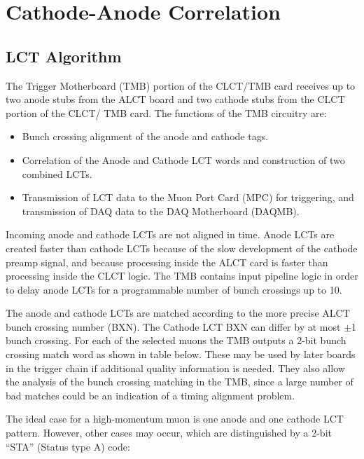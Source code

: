 \section{Cathode-Anode Correlation}

\label{sec:lct}

\subsection{LCT Algorithm}
\label{subsec:lct_algo}

The Trigger Motherboard (TMB) portion of the CLCT/TMB card receives up to two
anode stubs from the ALCT board and two cathode stubs from the CLCT portion of the CLCT/
TMB card. The functions of the TMB circuitry are:

\begin{itemize}
	\item Bunch crossing alignment of the anode and cathode tags.
	\item Correlation of the Anode and Cathode LCT words and construction of two combined LCTs.
	\item Transmission of LCT data to the Muon Port Card (MPC) for triggering, and transmission of DAQ data to the DAQ Motherboard (DAQMB).
\end{itemize}

Incoming anode and cathode LCTs are not aligned in time. Anode LCTs are created
faster than cathode LCTs because of the slow development of the cathode preamp signal, and
because processing inside the ALCT card is faster than processing inside the CLCT logic. The
TMB contains input pipeline logic in order to delay anode LCTs for a programmable number of
bunch crossings up to 10.

The anode and cathode LCTs are matched according to the more precise ALCT bunch
crossing number (BXN). The Cathode LCT BXN can differ by at most $\pm$1 bunch crossing. For each
of the selected muons the TMB outputs a 2-bit bunch crossing match word as shown in
table below. These may be used by later boards in the trigger chain if additional quality information
is needed. They also allow the analysis of the bunch crossing matching in the TMB, since a large
number of bad matches could be an indication of a timing alignment problem.

The ideal case for a high-momentum muon is one anode and one cathode LCT pattern.
However, other cases may occur, which are distinguished by a 2-bit “STA” (Status type A) code:

